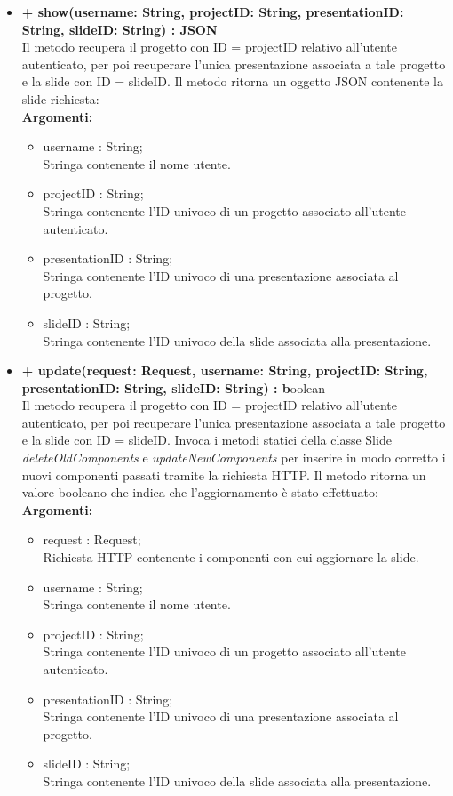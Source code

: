 \begin{itemize}
			\newpage
			\item \textbf{+ show(username: String, projectID: String, presentationID: String, slideID: String) : \gls{JSON}}\\
				Il metodo recupera il progetto con ID = projectID relativo all'utente autenticato, per poi recuperare l'unica presentazione associata a tale progetto e la \gls{slide} con ID = slideID. Il metodo ritorna un oggetto \gls{JSON} contenente la \gls{slide} richiesta:\\
				\textbf{Argomenti:}
					\begin{itemize}
						\item username : String; \\
						Stringa contenente il nome utente.
						\item projectID : String; \\
						Stringa contenente l'ID univoco di un progetto associato all'utente autenticato.
						\item presentationID : String; \\
						Stringa contenente l'ID univoco di una presentazione associata al progetto.
						\item slideID : String; \\
						Stringa contenente l'ID univoco della \gls{slide} associata alla presentazione.
					\end{itemize}
					
			\item \textbf{+ update(request: Request, username: String, projectID: String, presentationID: String, slideID: String) : b}oolean\\
				Il metodo recupera il progetto con ID = projectID relativo all'utente autenticato, per poi recuperare l'unica presentazione associata a tale progetto e la \gls{slide} con ID = slideID. Invoca i metodi statici della classe \gls{Slide} \textit{deleteOldComponents} e \textit{updateNewComponents} per inserire in modo corretto i nuovi componenti passati tramite la richiesta HTTP. Il metodo ritorna un valore booleano che indica che l'aggiornamento è stato effettuato:\\
					\textbf{Argomenti:}
					\begin{itemize}
						\item request : Request;\\
						Richiesta HTTP contenente i componenti con cui aggiornare la \gls{slide}.
						\item username : String; \\
						Stringa contenente il nome utente.
						\item projectID : String; \\
						Stringa contenente l'ID univoco di un progetto associato all'utente autenticato.
						\item presentationID : String; \\
						Stringa contenente l'ID univoco di una presentazione associata al progetto.
						\item slideID : String; \\
						Stringa contenente l'ID univoco della \gls{slide} associata alla presentazione.
					\end{itemize}
					

\end{itemize}
